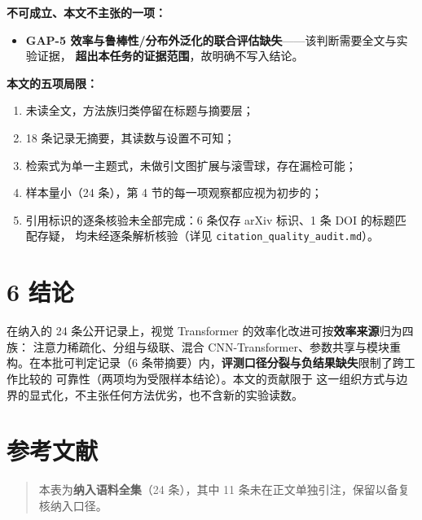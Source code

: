 \documentclass[
  chinese,
]{article}
\providecommand{\tightlist}{%
  \setlength{\itemsep}{0pt}\setlength{\parskip}{0pt}}
\begin{document}
\textbf{不可成立、本文不主张的一项：}

\begin{itemize}
\tightlist
\item
  \textbf{GAP-5
  效率与鲁棒性/分布外泛化的联合评估缺失}------该判断需要全文与实验证据，
  \textbf{超出本任务的证据范围}，故明确不写入结论。
\end{itemize}

\textbf{本文的五项局限：}

\begin{enumerate}
\def\labelenumi{\arabic{enumi}.}
\tightlist
\item
  未读全文，方法族归类停留在标题与摘要层；
\item
  18 条记录无摘要，其读数与设置不可知；
\item
  检索式为单一主题式，未做引文图扩展与滚雪球，存在漏检可能；
\item
  样本量小（24 条），第 4 节的每一项观察都应视为初步的；
\item
  引用标识的逐条核验未全部完成：6 条仅存 arXiv 标识、1 条 DOI
  的标题匹配存疑， 均未经逐条解析核验（详见
  \texttt{citation\_quality\_audit.md}）。
\end{enumerate}

\section{6 结论}\label{ux7ed3ux8bba}

在纳入的 24 条公开记录上，视觉 Transformer
的效率化改进可按\textbf{效率来源}归为四族：
注意力稀疏化、分组与级联、混合
CNN-Transformer、参数共享与模块重构。在本批可判定记录（6
条带摘要）内，\textbf{评测口径分裂与负结果缺失}限制了跨工作比较的
可靠性（两项均为受限样本结论）。本文的贡献限于
这一组织方式与边界的显式化，不主张任何方法优劣，也不含新的实验读数。

\section{参考文献}\label{ux53c2ux8003ux6587ux732e}

\begin{quote}
本表为\textbf{纳入语料全集}（24 条），其中 11
条未在正文单独引注，保留以备复核纳入口径。
\end{quote}
\end{document}
